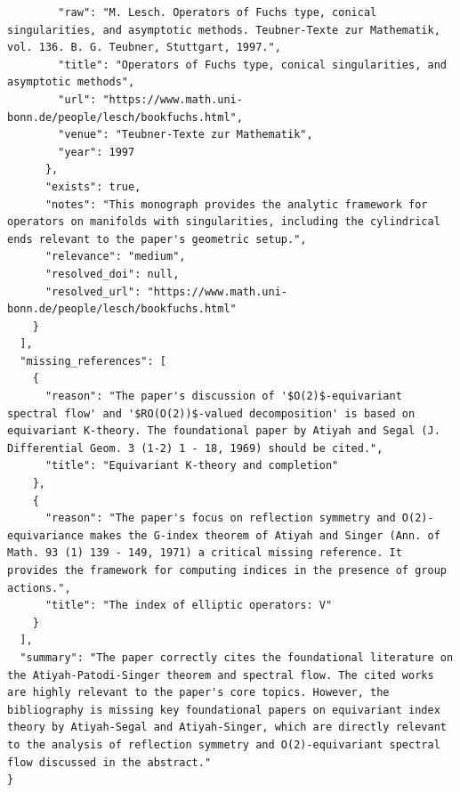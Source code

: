 \documentclass[11pt]{article}
\begin{document}
\begin{verbatim}
        "raw": "M. Lesch. Operators of Fuchs type, conical singularities, and asymptotic methods. Teubner-Texte zur Mathematik, vol. 136. B. G. Teubner, Stuttgart, 1997.",
        "title": "Operators of Fuchs type, conical singularities, and asymptotic methods",
        "url": "https://www.math.uni-bonn.de/people/lesch/bookfuchs.html",
        "venue": "Teubner-Texte zur Mathematik",
        "year": 1997
      },
      "exists": true,
      "notes": "This monograph provides the analytic framework for operators on manifolds with singularities, including the cylindrical ends relevant to the paper's geometric setup.",
      "relevance": "medium",
      "resolved_doi": null,
      "resolved_url": "https://www.math.uni-bonn.de/people/lesch/bookfuchs.html"
    }
  ],
  "missing_references": [
    {
      "reason": "The paper's discussion of '$O(2)$-equivariant spectral flow' and '$RO(O(2))$-valued decomposition' is based on equivariant K-theory. The foundational paper by Atiyah and Segal (J. Differential Geom. 3 (1-2) 1 - 18, 1969) should be cited.",
      "title": "Equivariant K-theory and completion"
    },
    {
      "reason": "The paper's focus on reflection symmetry and O(2)-equivariance makes the G-index theorem of Atiyah and Singer (Ann. of Math. 93 (1) 139 - 149, 1971) a critical missing reference. It provides the framework for computing indices in the presence of group actions.",
      "title": "The index of elliptic operators: V"
    }
  ],
  "summary": "The paper correctly cites the foundational literature on the Atiyah-Patodi-Singer theorem and spectral flow. The cited works are highly relevant to the paper's core topics. However, the bibliography is missing key foundational papers on equivariant index theory by Atiyah-Segal and Atiyah-Singer, which are directly relevant to the analysis of reflection symmetry and O(2)-equivariant spectral flow discussed in the abstract."
}
\end{verbatim}
\end{document}
